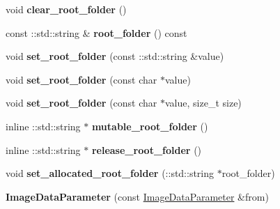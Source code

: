 \begin{DoxyCompactItemize}
void {\bfseries clear\+\_\+root\+\_\+folder} ()
\item 
\mbox{\label{classcaffe_1_1_image_data_parameter_aab2b53ae0938646a2a3e41b940560558}} 
const \+::std\+::string \& {\bfseries root\+\_\+folder} () const
\item 
\mbox{\label{classcaffe_1_1_image_data_parameter_abf1d2037c2041c0c304f41b2c77fbaa7}} 
void {\bfseries set\+\_\+root\+\_\+folder} (const \+::std\+::string \&value)
\item 
\mbox{\label{classcaffe_1_1_image_data_parameter_a7dafe43490aeb92adb6f77446b264f95}} 
void {\bfseries set\+\_\+root\+\_\+folder} (const char $\ast$value)
\item 
\mbox{\label{classcaffe_1_1_image_data_parameter_ad1280155060ee96c895d03bedbbc58b5}} 
void {\bfseries set\+\_\+root\+\_\+folder} (const char $\ast$value, size\+\_\+t size)
\item 
\mbox{\label{classcaffe_1_1_image_data_parameter_a7880756e84ee4143452ac95ab824b923}} 
inline \+::std\+::string $\ast$ {\bfseries mutable\+\_\+root\+\_\+folder} ()
\item 
\mbox{\label{classcaffe_1_1_image_data_parameter_a5932c6afe8411de4ebd5dc39421d9fc4}} 
inline \+::std\+::string $\ast$ {\bfseries release\+\_\+root\+\_\+folder} ()
\item 
\mbox{\label{classcaffe_1_1_image_data_parameter_a308ddfc3d1519068464057ef409b38c6}} 
void {\bfseries set\+\_\+allocated\+\_\+root\+\_\+folder} (\+::std\+::string $\ast$root\+\_\+folder)
\item 
\mbox{\label{classcaffe_1_1_image_data_parameter_a0d0d44207ebf5f26f06ed529852d1ab4}} 
{\bfseries Image\+Data\+Parameter} (const \mbox{\hyperlink{classcaffe_1_1_image_data_parameter}{Image\+Data\+Parameter}} \&from)
\item 
\mbox{\label{classcaffe_1_1_image_data_parameter_a8bc4ec6ecc78d55236fd807a4f64ec8f}} 

\end{DoxyCompactItemize}
